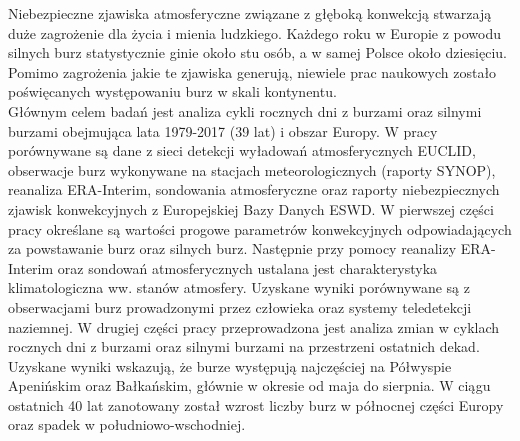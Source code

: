 \documentclass[\main/boa.tex]{subfiles}
\begin{document}
Niebezpieczne zjawiska atmosferyczne związane z głęboką konwekcją stwarzają duże zagrożenie dla życia i mienia ludzkiego. Każdego roku w Europie z powodu silnych burz statystycznie ginie około stu osób, a w samej Polsce około dziesięciu. Pomimo zagrożenia jakie te zjawiska generują, niewiele prac naukowych zostało poświęcanych występowaniu burz w skali kontynentu. \\Głównym celem badań jest analiza cykli rocznych dni z burzami oraz silnymi burzami obejmująca lata 1979-2017 (39 lat) i obszar Europy. W pracy porównywane są dane z sieci detekcji wyładowań atmosferycznych EUCLID, obserwacje burz wykonywane na stacjach meteorologicznych (raporty SYNOP), reanaliza ERA-Interim, sondowania atmosferyczne oraz raporty niebezpiecznych zjawisk konwekcyjnych z Europejskiej Bazy Danych ESWD. W pierwszej części pracy określane są wartości progowe parametrów konwekcyjnych odpowiadających za powstawanie burz oraz silnych burz. Następnie przy pomocy reanalizy ERA-Interim oraz sondowań atmosferycznych ustalana jest charakterystyka klimatologiczna ww. stanów atmosfery. Uzyskane wyniki porównywane są z obserwacjami burz prowadzonymi przez człowieka oraz systemy teledetekcji naziemnej. W drugiej części pracy przeprowadzona jest analiza zmian w cyklach rocznych dni z burzami oraz silnymi burzami na przestrzeni ostatnich dekad.\\ Uzyskane wyniki wskazują, że burze występują najczęściej na Półwyspie Apenińskim oraz Bałkańskim, głównie w okresie od maja do sierpnia. W ciągu ostatnich 40 lat zanotowany został wzrost liczby burz w północnej części Europy oraz spadek w południowo-wschodniej.
\end{document}
